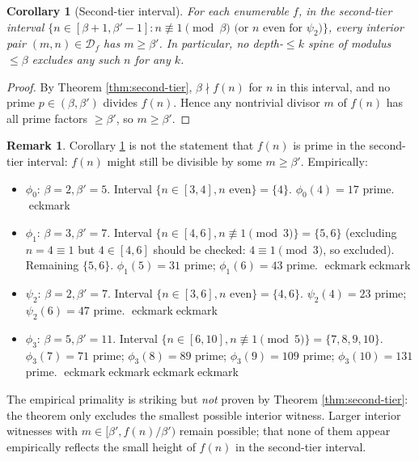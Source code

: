 \documentclass[11pt]{article}
\newtheorem{corollary}[theorem]{Corollary}
\theoremstyle{definition}
\newtheorem{remark}[theorem]{Remark}
\newcommand{\Df}{\mathcal{D}_f}
\begin{document}
\begin{corollary}[Second-tier interval]\label{cor:second-tier-interval}
For each enumerable $f$, in the second-tier interval $\{n \in [\beta+1,\beta'-1] : n \not\equiv 1 \pmod \beta \text{ (or $n$ even for $\psi_2$)}\}$, every interior pair $(m, n) \in \Df$ has $m \ge \beta'$. In particular, no depth-$\le k$ spine of modulus $\le \beta$ excludes any such $n$ for any $k$.
\end{corollary}

\begin{proof}
By Theorem \ref{thm:second-tier}, $\beta \nmid f(n)$ for $n$ in this interval, and no prime $p \in (\beta, \beta')$ divides $f(n)$. Hence any nontrivial divisor $m$ of $f(n)$ has all prime factors $\ge \beta'$, so $m \ge \beta'$.
\end{proof}

\begin{remark}\label{rem:second-tier-empirical}
Corollary \ref{cor:second-tier-interval} is not the statement that $f(n)$ is prime in the second-tier interval: $f(n)$ might still be divisible by some $m \ge \beta'$. Empirically:
\begin{itemize}
\item $\phi_0$: $\beta = 2, \beta' = 5$. Interval $\{n \in [3, 4], n$ even$\} = \{4\}$. $\phi_0(4) = 17$ prime. eckmark
\item $\phi_1$: $\beta = 3, \beta' = 7$. Interval $\{n \in [4,6], n \not\equiv 1 \pmod 3\} = \{5, 6\}$ (excluding $n = 4 \equiv 1$ but $4 \in [4,6]$ should be checked: $4 \equiv 1 \pmod 3$, so excluded). Remaining $\{5, 6\}$. $\phi_1(5) = 31$ prime; $\phi_1(6) = 43$ prime. eckmarkeckmark
\item $\psi_2$: $\beta = 2, \beta' = 7$. Interval $\{n \in [3,6], n$ even$\} = \{4, 6\}$. $\psi_2(4) = 23$ prime; $\psi_2(6) = 47$ prime. eckmarkeckmark
\item $\phi_3$: $\beta = 5, \beta' = 11$. Interval $\{n \in [6, 10], n \not\equiv 1 \pmod 5\} = \{7, 8, 9, 10\}$. $\phi_3(7) = 71$ prime; $\phi_3(8) = 89$ prime; $\phi_3(9) = 109$ prime; $\phi_3(10) = 131$ prime. eckmarkeckmarkeckmarkeckmark
\end{itemize}
The empirical primality is striking but \emph{not} proven by Theorem \ref{thm:second-tier}: the theorem only excludes the smallest possible interior witness. Larger interior witnesses with $m \in [\beta', f(n)/\beta')$ remain possible; that none of them appear empirically reflects the small height of $f(n)$ in the second-tier interval.
\end{remark}
\end{document}
